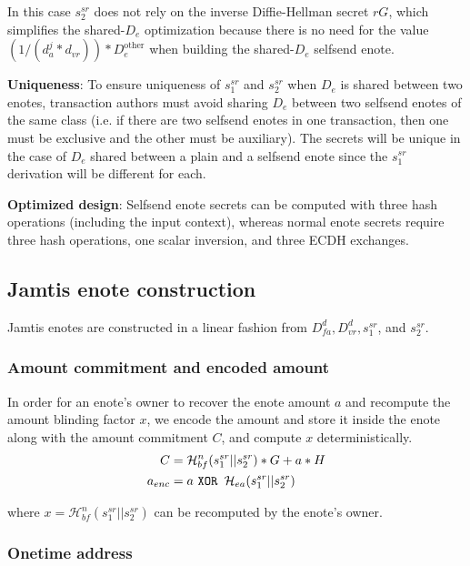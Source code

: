 In this case $s^{sr}_2$ does not rely on the inverse Diffie-Hellman secret $r G$, which simplifies the shared-$D_e$ optimization because there is no need for the value $(1/(d^j_a * d_{vr})) * D^{\textrm{other}}_e$ when building the shared-$D_e$ selfsend enote.

\textbf{Uniqueness}: To ensure uniqueness of $s^{sr}_1$ and $s^{sr}_2$ when $D_e$ is shared between two enotes, transaction authors must avoid sharing $D_e$ between two selfsend enotes of the same class (i.e. if there are two selfsend enotes in one transaction, then one must be exclusive and the other must be auxiliary). The secrets will be unique in the case of $D_e$ shared between a plain and a selfsend enote since the $s^{sr}_1$ derivation will be different for each.

\textbf{Optimized design}: Selfsend enote secrets can be computed with three hash operations (including the input context), whereas normal enote secrets require three hash operations, one scalar inversion, and three ECDH exchanges.


\subsection{Jamtis enote construction}
\label{subsec:jamtis-enote-construction}

Jamtis enotes are constructed in a linear fashion from $D^d_{fa}, D^d_{vr}, s^{sr}_1$, and $s^{sr}_2$.

\subsubsection{Amount commitment and encoded amount}
\label{subsubsec:jamtis-enote-construction-amount}

In order for an enote's owner to recover the enote amount $a$ and recompute the amount blinding factor $x$, we encode the amount and store it inside the enote along with the amount commitment $C$, and compute $x$ deterministically.\vspace{.115cm}
\begin{align*}
    C       &= \mathcal{H}^n_{bf}(s^{sr}_1 || s^{sr}_2)*G + a*H \\
    a_{enc} &= a \textrm{ \tt  XOR } \mathcal{H}_{ea}(s^{sr}_1 || s^{sr}_2)
\end{align*}

where $x = \mathcal{H}^n_{bf}(s^{sr}_1 || s^{sr}_2)$ can be recomputed by the enote's owner.

\subsubsection{Onetime address}
\label{subsubsec:jamtis-enote-construction-onetime-address}

